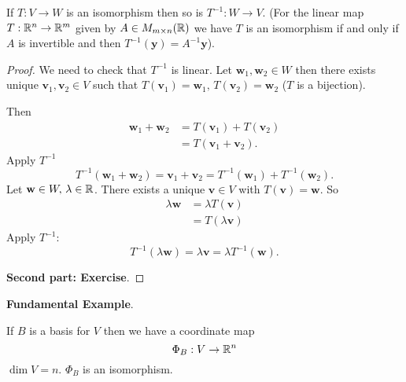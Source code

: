 \documentclass[10pt, a4paper]{article}
\newcommand{\mbf}[1]{\mathbf{#1}}
\begin{document}
\begin{lemma}
    If $T : V \rightarrow W$ is an isomorphism then so is $T ^ {-1} : W \rightarrow V$.
    (For the linear map $T : \mathbb{R} ^ n \rightarrow \mathbb{R} ^ m$ given by $A \in M_{m \times n}(\mathbb{R})$ we have $T$ is an isomorphism if and only if $A$ is invertible and then $T ^ {-1}(\mbf{y}) = A ^ {-1}\mbf{y}$).
    \begin{proof}
        We need to check that $T ^ {-1}$ is linear.
        Let $\mbf{w}_1, \mbf{w}_2 \in W$ then there exists unique $\mbf{v}_1, \mbf{v}_2 \in V$ such that $T(\mbf{v}_1) = \mbf{w}_1,\, T(\mbf{v}_2) = \mbf{w}_2$
        ($T$ is a bijection).

        Then
        \begin{align*}
            \mbf{w}_1 + \mbf{w}_2 &= T(\mbf{v}_1) + T(\mbf{v}_2) \\
            &= T(\mbf{v}_1 + \mbf{v}_2).
        \end{align*}
        Apply $T ^ {-1}$
        \[
        T ^ {-1}(\mbf{w}_1 + \mbf{w}_2) = \mbf{v}_1 + \mbf{v}_2 = T ^ {-1}(\mbf{w}_1) + T ^ {-1}(\mbf{w}_2).
        \]
        Let $\mbf{w} \in W,\, \lambda \in \R$.
        There exists a unique $\mbf{v} \in V$ with $T(\mbf{v}) = \mbf{w}$.
        So
        \begin{align*}
            \lambda\mbf{w} &= \lambda T(\mbf{v}) \\
            &= T(\lambda\mbf{v})
        \end{align*}
        Apply $T ^ {-1}$:
        \[
        T ^ {-1}(\lambda\mbf{w}) = \lambda\mbf{v} = \lambda T ^ {-1}(\mbf{w}).
        \]
        
        
        \textbf{Second part: Exercise}.
    \end{proof}
\end{lemma}

\textbf{Fundamental Example}.

If $B$ is a basis for $V$ then we have a coordinate map
\[
\Phi_B : V \rightarrow \mathbb{R} ^ n
\]
$\dim{V} = n$.
$\Phi_B$ is an isomorphism.
\end{document}
